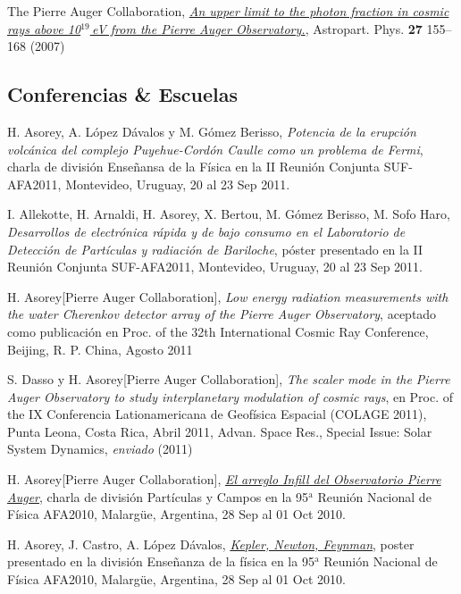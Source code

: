 \documentclass[11pt, a4paper]{article}
\newcommand{\years}[1]{\marginnote{\scriptsize #1}}
\begin{document}
\years{2007}The Pierre Auger Collaboration, \href{http://dx.doi.org/10.1016/j.astropartphys.2006.10.004}{\emph{An upper limit to the photon fraction in cosmic rays above 10$^{19}$\,eV from the Pierre Auger Observatory.}}, Astropart. Phys. {\bf 27} 155--168 (2007)

\subsection*{Conferencias \& Escuelas}
\noindent

\years{2011}H. Asorey, A. López Dávalos y M. Gómez Berisso, {\emph{Potencia de
la erupción volcánica del complejo Puyehue-Cordón Caulle como un problema de
Fermi}}, charla de división Enseñansa de la Física en la II Reunión Conjunta
SUF-AFA2011, Montevideo, Uruguay, 20 al 23 Sep 2011.

\years{2011}I. Allekotte, H. Arnaldi, H. Asorey, X. Bertou, M. Gómez Berisso,
M. Sofo Haro, {\emph{Desarrollos de electrónica rápida y de bajo consumo en el
Laboratorio de Detección de Partículas y radiación de Bariloche}}, póster
presentado en la II Reunión Conjunta SUF-AFA2011, Montevideo, Uruguay, 20 al 23
Sep 2011.

\years{2011}H. Asorey[Pierre Auger Collaboration], {\emph{Low energy radiation
measurements with the water Cherenkov detector array of the Pierre Auger
Observatory}}, aceptado como publicación en Proc. of the 32th International
Cosmic Ray Conference, Beijing, R. P. China, Agosto 2011

\years{2011}S. Dasso y H. Asorey[Pierre Auger Collaboration], {\emph{The scaler
mode in the Pierre Auger Observatory to study interplanetary modulation of
cosmic rays}}, en Proc. of the IX Conferencia Lationamericana de Geofísica
Espacial (COLAGE 2011), Punta Leona, Costa Rica, Abril 2011, Advan. Space Res.,
Special Issue: Solar System Dynamics, {\emph{enviado}} (2011)

\years{2010}H. Asorey[Pierre Auger Collaboration], \href{http://95rnf.afa.webfactional.com/tex\_files/Resumenes/DPyC/PyC\_6.pdf}{\emph{El arreglo Infill del
Observatorio Pierre Auger}}, charla de división Partículas y Campos en la
95$^\mathrm{a}$ Reunión Nacional de Física AFA2010, Malargüe, Argentina, 28 Sep
al 01 Oct 2010.

\years{2010}H. Asorey, J. Castro, A. López Dávalos, \href{http://95rnf.afa.webfactional.com/tex\_files/Resumenes/EF/asorey.pdf}{\emph{Kepler, Newton, Feynman}}, poster presentado en la división Enseñanza de la física en la 95$^\mathrm{a}$ Reunión Nacional de Física AFA2010, Malargüe, Argentina, 28 Sep al 01 Oct 2010.
\end{document}
